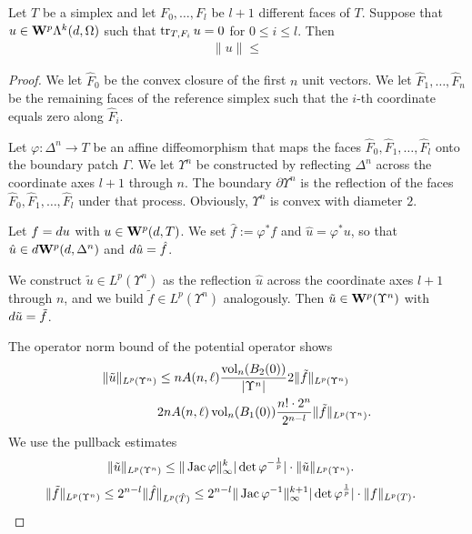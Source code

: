\documentclass[12pt,a4paper]{article}
\begin{document}
\begin{lemma}
    Let $T$ be a simplex and let $F_{0},\dots,F_{l}$ be $l+1$ different faces of $T$. 
    Suppose that $u \in {\mathbf W}^{p}\Lambda^{k}(d,\Omega)$ such that 
    $\operatorname{tr}_{T,F_i} u = 0$ for $0 \leq i \leq l$.
    Then 
    \begin{align*}
        \| u \| \leq 
    \end{align*}
\end{lemma}
\begin{proof}
    We let $\hat F_0$ be the convex closure of the first $n$ unit vectors. 
    We let $\hat F_1, \dots, \hat F_n$ be the remaining faces of the reference simplex 
    such that the $i$-th coordinate equals zero along $\hat F_i$.

    Let $\varphi : \Delta^{n} \rightarrow T$ be an affine diffeomorphism 
    that maps the faces $\hat F_{0}, \hat F_{1}, \dots, \hat F_{l}$ onto the boundary patch $\Gamma$. 
    We let $\Upsilon^{n}$ be constructed by reflecting $\Delta^{n}$ across the coordinate axes $l+1$ through $n$.
    The boundary $\partial\Upsilon^{n}$ is the reflection of the faces $\hat F_{0}, \hat F_{1}, \dots, \hat F_{l}$ under that process. 
    Obviously, $\Upsilon^{n}$ is convex with diameter $2$. 


    Let $f = d u$ with $u \in {\mathbf W}^{p}(d,T)$.
    We set $\hat f := \varphi^{\ast} f$ and $\hat u = \varphi^{\ast} u$, 
    so that $\hat u \in d {\mathbf W}^{p}(d,\Delta^{n})$ and $d \hat u = \hat f$.

    We construct $\tilde u \in L^{p}(\Upsilon^{n})$ as the reflection $\hat u$ across the coordinate axes $l+1$ through $n$, and we build $\tilde f \in L^{p}(\Upsilon^{n})$ analogously.
    Then $\tilde u \in {\mathbf W}^{p}(\Upsilon^{n})$ with $d \tilde u = \tilde f$. 

    The operator norm bound of the potential operator shows 
    \begin{align*}
        \| \tilde u \|_{L^{p}(\Upsilon^{n})} 
        &\leq 
        n A(n,\ell) \frac{ \operatorname{vol}_{n}(B_2(0)) }{|\Upsilon^{n}|} 2 
        \| \tilde f \|_{L^{p}(\Upsilon^{n})}
        \\&
        2 n A(n,\ell) \operatorname{vol}_{n}(B_1(0)) \frac{ n! \cdot 2^{n} }{2^{n-l}} 
        \| \tilde f \|_{L^{p}(\Upsilon^{n})}
        .
    \end{align*}
    We use the pullback estimates 
    \begin{align*}
        \| \tilde u \|_{L^{p}(\Upsilon^{n})} 
        &\leq 
        \| \operatorname{{\rm Jac}}\varphi \|_{\infty}^{k}
        |\det\varphi^{-\frac{1}{p}}|
        \cdot 
        \| \tilde u \|_{L^{p}(\Upsilon^{n})} 
        .
    \end{align*}
    \begin{align*}
        \| \tilde f \|_{L^{p}(\Upsilon^{n})} 
        &\leq 
        2^{n-l}
        \| \hat f \|_{L^{p}(\hat T)} 
        \leq 
        2^{n-l}
        \| \operatorname{{\rm Jac}}\varphi^{-1} \|_{\infty}^{k+1}
        |\det\varphi^{\frac{1}{p}}|
        \cdot 
        \| f \|_{L^{p}(T)} 
        .
    \end{align*}
\end{proof}
\end{document}
